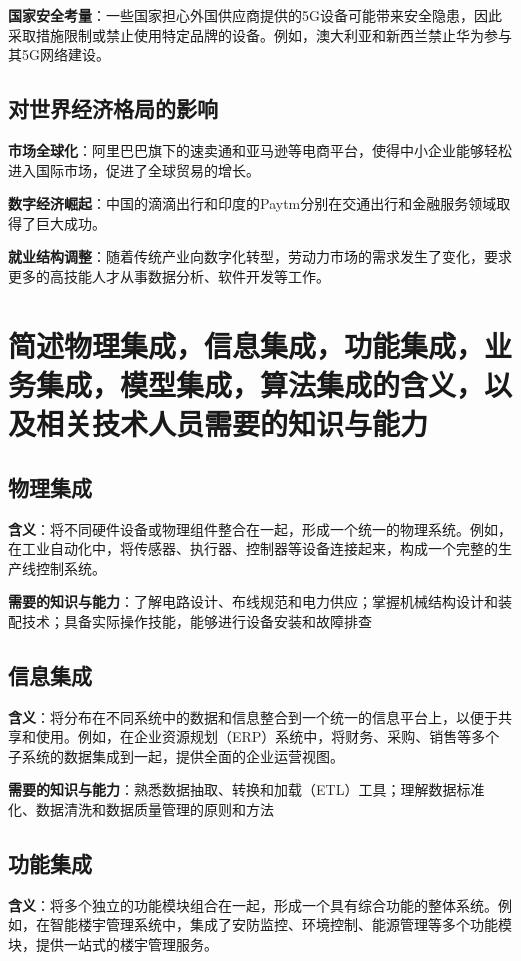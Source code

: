 \documentclass[UTF8,a4paper]{ctexart}
\begin{document}
	\textbf{国家安全考量}：一些国家担心外国供应商提供的5G设备可能带来安全隐患，因此采取措施限制或禁止使用特定品牌的设备。例如，澳大利亚和新西兰禁止华为参与其5G网络建设。
	
	\subsection{对世界经济格局的影响}
	\textbf{市场全球化}：阿里巴巴旗下的速卖通和亚马逊等电商平台，使得中小企业能够轻松进入国际市场，促进了全球贸易的增长。
	
	\textbf{数字经济崛起}：中国的滴滴出行和印度的Paytm分别在交通出行和金融服务领域取得了巨大成功。
	
	\textbf{就业结构调整}：随着传统产业向数字化转型，劳动力市场的需求发生了变化，要求更多的高技能人才从事数据分析、软件开发等工作。
	
    \newpage

    \section{简述物理集成，信息集成，功能集成，业务集成，模型集成，算法集成的含义，以及相关技术人员需要的知识与能力}
	
	\subsection{物理集成}
	\textbf{含义}：将不同硬件设备或物理组件整合在一起，形成一个统一的物理系统。例如，在工业自动化中，将传感器、执行器、控制器等设备连接起来，构成一个完整的生产线控制系统。
	
	\textbf{需要的知识与能力}：了解电路设计、布线规范和电力供应；掌握机械结构设计和装配技术；具备实际操作技能，能够进行设备安装和故障排查


    \subsection{信息集成}
	\textbf{含义}：将分布在不同系统中的数据和信息整合到一个统一的信息平台上，以便于共享和使用。例如，在企业资源规划（ERP）系统中，将财务、采购、销售等多个子系统的数据集成到一起，提供全面的企业运营视图。
	
	\textbf{需要的知识与能力}：熟悉数据抽取、转换和加载（ETL）工具；理解数据标准化、数据清洗和数据质量管理的原则和方法


    \subsection{功能集成}
	\textbf{含义}：将多个独立的功能模块组合在一起，形成一个具有综合功能的整体系统。例如，在智能楼宇管理系统中，集成了安防监控、环境控制、能源管理等多个功能模块，提供一站式的楼宇管理服务。
	
\end{document}
